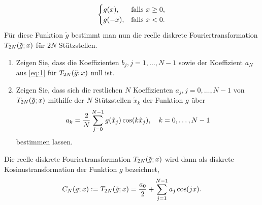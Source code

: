 \documentclass{exercise}
\begin{document}
\begin{problem}
\[\begin{cases}
                g\parentheses*{x}, & \text{falls }x \ge 0,\\
                g\parentheses*{-x}, & \text{falls }x < 0.
            \end{cases}
        \]
        Für diese Funktion \(\tilde{g}\) bestimmt man nun die reelle diskrete Fouriertransformation \(T_{2N}\parentheses*{\tilde{g}; x}\) für \(2N\) Stützstellen.
        \begin{enumerate}
            \item Zeigen Sie, dass die Koeffizienten \(b_j, j = 1, \ldots, N - 1\) sowie der Koeffizient \(a_N\) aus \eqref{eq:1} für \(T_{2N}\parentheses*{\tilde{g}; x}\) null ist.
            \item Zeigen Sie, dass sich die restlichen \(N\) Koeffizienten \(a_j, j = 0, \ldots, N - 1\) von \(T_{2N}\parentheses*{\tilde{g}; x}\) mithilfe der \(N\) Stützstellen \(\tilde{x}_k\) der Funktion \(g\) über
            \[
                a_k = \frac{2}{N}\sum_{j = 0}^{N - 1}g\parentheses*{\tilde{x}_j}\cos\parentheses*{k\tilde{x}_j}, \quad k = 0, \ldots, N - 1
            \]
            bestimmen lassen.
        \end{enumerate}
        Die reelle diskrete Fouriertransformation \(T_{2N}\parentheses*{\tilde{g}; x}\) wird dann als diskrete Kosinustransformation der Funktion \(g\) bezeichnet,
        \[
            C_N\parentheses*{g; x} := T_{2N}\parentheses*{\tilde{g}; x} = \frac{a_0}{2} + \sum_{j = 1}^{N - 1}a_j\cos\parentheses*{jx}.
        \]
    \end{problem}
\end{document}
